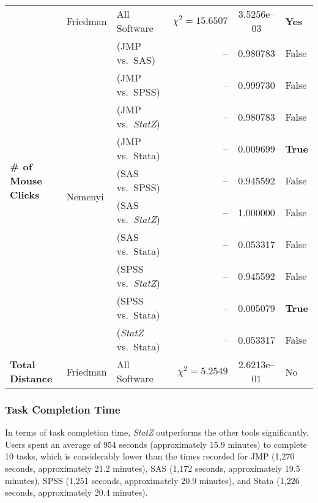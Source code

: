 \documentclass{article}
\begin{document}
\begin{table}[htbp]
{\begin{tabular}{lllrcl}
\multirow{11}{*}{\parbox{3.7cm}{\textbf{\# of Mouse Clicks}}}
 & \multirow{1}{*}{Friedman}
    & All Software & $\chi^2 = 15.6507$ & 3.5256e--03 & \textbf{Yes} \\
 \cmidrule(lr){2-6}
 & \multirow{10}{*}{Nemenyi}
    & (JMP vs.\ SAS)    & -- & 0.980783       & False \\
 &  & (JMP vs.\ SPSS)   & -- & 0.999730       & False \\
 &  & (JMP vs.\ \textit{StatZ})  & -- & 0.980783       & False \\
 &  & (JMP vs.\ Stata)  & -- & 0.009699       & \textbf{True} \\
 &  & (SAS vs.\ SPSS)   & -- & 0.945592       & False \\
 &  & (SAS vs.\ \textit{StatZ})  & -- & 1.000000       & False \\
 &  & (SAS vs.\ Stata)  & -- & 0.053317       & False \\
 &  & (SPSS vs.\ \textit{StatZ}) & -- & 0.945592       & False \\
 &  & (SPSS vs.\ Stata) & -- & 0.005079       & \textbf{True} \\
 &  & (\textit{StatZ} vs.\ Stata)& -- & 0.053317       & False \\
\midrule

\multirow{1}{*}{\textbf{Total Distance}}
 & \multirow{1}{*}{Friedman}
    & All Software & $\chi^2 = 5.2549$ & 2.6213e--01 & No \\
\bottomrule
\end{tabular}
} %
\label{tab:combined_results}
\end{table}

\subsubsection{Task Completion Time}
In terms of task completion time, \textit{StatZ} outperforms the other tools significantly. Users spent an average of 954 seconds (approximately 15.9 minutes) to complete 10 tasks, which is considerably lower than the times recorded for JMP (1,270 seconds, approximately 21.2 minutes), SAS (1,172 seconds, approximately 19.5 minutes), SPSS (1,251 seconds, approximately 20.9 minutes), and Stata (1,226 seconds, approximately 20.4 minutes).
\end{document}
